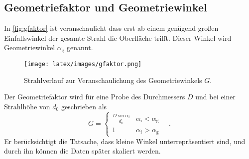    \subsection{Geometriefaktor und Geometriewinkel}

        \noindent 
        In \autoref{fig:gfaktor} ist veranschaulicht dass erst ab einem genügend großen Einfallswinkel der gesamte Strahl die Oberfläche trifft. 
        Dieser Winkel wird Geometriewinkel $\alpha_\text{g}$ genannt. 
        \begin{figure}
            \centering
            \texttt{[image: latex/images/gfaktor.png]}
            \caption{Strahlverlauf zur Veranschaulichung des Geometriewinkels $G$. \cite{V44}}
            \label{fig:gfaktor}
        \end{figure}
        Der Geometriefaktor wird für eine Probe des Durchmessers $D$ und bei einer 
        Strahlhöhe von $d_0$ geschrieben als 
        \begin{equation}
            G = \begin{cases}
                \frac{D \sin{\alpha_i}}{d_0} & \alpha_i < \alpha_\text{g} \\
                1 & \alpha_i > \alpha_\text{g}
            \end{cases} \label{eqn:G}\quad .
        \end{equation}
        Er berücksichtigt die Tatsache, dass kleine Winkel unterrepräsentiert sind, und durch ihn können die Daten später skaliert werden. 